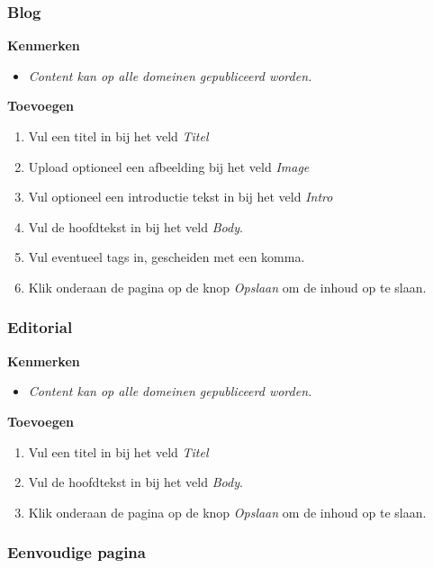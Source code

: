 \subsubsection{Blog}\label{blog}

\textbf{Kenmerken}

\begin{itemize}
\item \emph{Content kan op alle domeinen gepubliceerd worden.}
\end{itemize}

\textbf{Toevoegen}

\begin{enumerate}
\item Vul een titel in bij het veld \emph{Titel}
\item Upload optioneel een afbeelding bij het veld \emph{Image}
\item Vul optioneel een introductie tekst in bij het veld \emph{Intro}
\item Vul de hoofdtekst in bij het veld \emph{Body}.
\item Vul eventueel tags in, gescheiden met een komma.
\item Klik onderaan de pagina op de knop \emph{Opslaan} om de inhoud op te slaan.
\end{enumerate}

\subsubsection{Editorial}\label{editorial}

\textbf{Kenmerken}

\begin{itemize}
\item \emph{Content kan op alle domeinen gepubliceerd worden.}
\end{itemize}

\textbf{Toevoegen}

\begin{enumerate}
\item Vul een titel in bij het veld \emph{Titel}
\item Vul de hoofdtekst in bij het veld \emph{Body}.
\item Klik onderaan de pagina op de knop \emph{Opslaan} om de inhoud op te slaan.
\end{enumerate}

\subsubsection{Eenvoudige pagina}\label{eenvoudigepagina}

